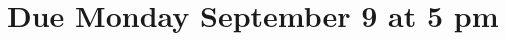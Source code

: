\documentclass[11pt,fleqn]{article}
\begin{document}
\maketitle
\section*{Due Monday September 9 at 5 pm}










\end{document}
